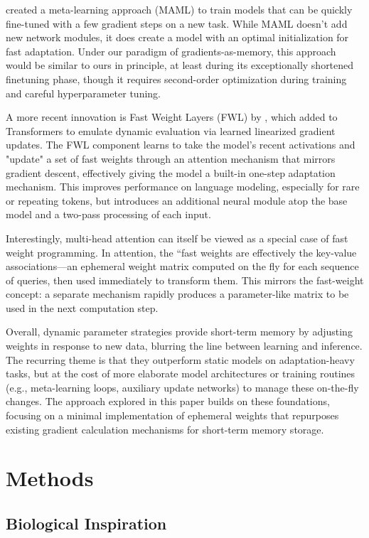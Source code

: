 \documentclass[conference]{IEEEtran}
\begin{document}
\cite{finnModelagnosticMetalearningFast2017} created a meta-learning approach (MAML) to train models that can be quickly fine-tuned with a few gradient steps on a new task. While MAML doesn't add new network modules, it does create a model with an optimal initialization for fast adaptation. Under our paradigm of gradients-as-memory, this approach would be similar to ours in principle, at least during its exceptionally shortened finetuning phase, though it requires second-order optimization during training and careful hyperparameter tuning.

A more recent innovation is Fast Weight Layers (FWL) by \cite{clark-etal-2022-meta}, which added to Transformers to emulate dynamic evaluation via learned linearized gradient updates. The FWL component learns to take the model's recent activations and "update" a set of fast weights through an attention mechanism that mirrors gradient descent, effectively giving the model a built-in one-step adaptation mechanism. This improves performance on language modeling, especially for rare or repeating tokens, but introduces an additional neural module atop the base model and a two-pass processing of each input.

Interestingly, multi-head attention can itself be viewed as a special case of fast weight programming. In attention, the ``fast weights are effectively the key-value associations—an ephemeral weight matrix computed on the fly for each sequence of queries, then used immediately to transform them. This mirrors the fast-weight concept: a separate mechanism rapidly produces a parameter-like matrix to be used in the next computation step.

Overall, dynamic parameter strategies provide short-term memory by adjusting weights in response to new data, blurring the line between learning and inference. The recurring theme is that they outperform static models on adaptation-heavy tasks, but at the cost of more elaborate model architectures or training routines (e.g., meta-learning loops, auxiliary update networks) to manage these on-the-fly changes. The approach explored in this paper builds on these foundations, focusing on a minimal implementation of ephemeral weights that repurposes existing gradient calculation mechanisms for short-term memory storage.

\section{Methods}

\subsection{Biological Inspiration}
\end{document}
